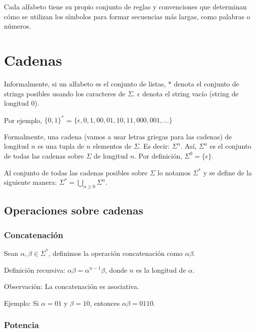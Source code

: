 \documentclass[11pt]{article}
\begin{document}
    Cada alfabeto tiene su propio conjunto de reglas y convenciones que determinan cómo se utilizan los símbolos para formar secuencias más largas, como palabras o números.

    \bigskip %


    \section{Cadenas}

    Informalmente, si un alfabeto es el conjunto de listas, $\ast$ denota el conjunto de strings posibles usando los caracteres de $\Sigma$. $\epsilon$ denota el string vacío (string de longitud 0).

    Por ejemplo, $\{0,1\}^{\ast}$ = $\{\epsilon, 0, 1, 00, 01, 10, 11, 000, 001, . . . \}$

    Formalmente, una cadena (vamos a usar letras griegas para las cadenas) de longitud $n$ es una tupla de $n$ elementos de $\Sigma$. Es decir: $\Sigma^n$. Así, $\Sigma^n$ es el conjunto de todas las cadenas sobre $\Sigma$ de longitud $n$. Por definición, $\Sigma^0 = \{\epsilon\}$.

    Al conjunto de todas las cadenas posibles sobre $\Sigma$ lo notamos $\Sigma^{\ast}$ y se define de la siguiente manera: $\Sigma^{\ast} = \bigcup_{n \geq 0} \Sigma^n$.

    \bigskip %

    \subsection{Operaciones sobre cadenas}

    \subsubsection{Concatenación}

    Sean $\alpha, \beta \in \Sigma^{\ast}$, definimos la operación concatenación como $\alpha \beta$.

    Definición recursiva: $\alpha \beta = \alpha^{n-1} \beta$, donde $n$ es la longitud de $\alpha$.

    Observación: La concatenación es asociativa.

    Ejemplo: Si $\alpha = 01$ y $\beta = 10$, entonces $\alpha \beta = 0110$.

    \bigskip %

    \subsubsection{Potencia}
\end{document}
